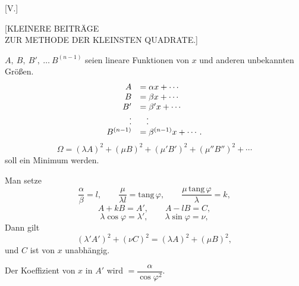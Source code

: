 \clearpage
{}
\begin{center}
[V.]

{\large [KLEINERE BEITRÄGE\\
ZUR METHODE DER KLEINSTEN QUADRATE.]}
\end{center}



$A,\ B,\ B',\ \ldots\ B^{(n-1)}$ seien lineare Funktionen von $x$ und anderen unbekannten Größen.
\[
\begin{array}{rl}
A&=\alpha x+\cdots\\
B&=\beta x+\cdots\\
B'&=\beta' x+\cdots\\
.&\hphantom{=} .\\[-.6em]
.&\hphantom{=} .\\
B^{(n-1)}&=\beta^{(n-1)}x+\cdots.
\end{array}
\]
\[
\Omega = (\lambda A)^2+(\mu B)^2+(\mu' B')^2+(\mu'' B'')^2+\cdots
\]
soll ein Minimum werden.

Man setze
\[
\frac{\alpha}{\beta}=l,\qquad \frac{\mu}{\lambda l}=\mathrm{tang}\,\varphi,\qquad
\frac{\mu\,\mathrm{tang}\,\varphi}{\lambda}=k,
\]
\[
A+kB=A',\qquad A-lB=C,
\]
\[
\lambda\cos\varphi=\lambda',\qquad \lambda\sin\varphi=\nu,
\]
Dann gilt
\[
(\lambda' A')^2+(\nu C)^2=(\lambda A)^2+(\mu B)^2,
\]
und $C$ ist von $x$ unabhängig.

Der Koeffizient von $x$ in $A'$ wird $=\dfrac{\alpha}{\cos\varphi^2}$.

